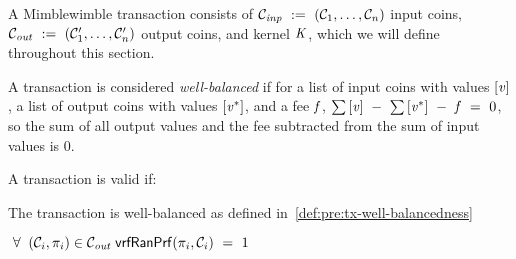 A Mimblewimble transaction consists of $\mathcal{C}_{\mathit{inp}} ~:=~ (\mathcal{C}_1 , \dots , \mathcal{C}_n)$ input coins, $\mathcal{C}_{\mathit{out}} ~:=~ (\mathcal{C}'_1 , \dots , \mathcal{C}'_n)$ output coins, and kernel $\mathit{K}$, which we will define throughout this section.
\begin{definition}  \label{def:pre:tx-well-balancedness}
    A transaction is considered \emph{well-balanced} if for a list of input coins with values $[\mathit{v}]$, a list of output coins with values $[\mathit{v}^*]$, and a fee $\mathit{f}$, $\sum{[\mathit{v}]} ~-~ \sum{[\mathit{v}^*]} ~-~ \mathit{f} ~=~ 0$, so the sum of all output values and the fee subtracted from the sum of input values is 0.
\end{definition}

\begin{definition} \label{def:pre:tx-mw-validity}
    A transaction is valid if:
    \begin{asparaitem}
        \item The transaction is well-balanced as defined in~\cref{def:pre:tx-well-balancedness}
        \item $\;\forall\; \; (\mathcal{C}_i, \pi_i) \in \mathcal{C}_{\mathit{out}} \; \mathsf{vrfRanPrf}(\pi_i,\mathcal{C}_i) ~=~ 1$
    \end{asparaitem}
\end{definition}

